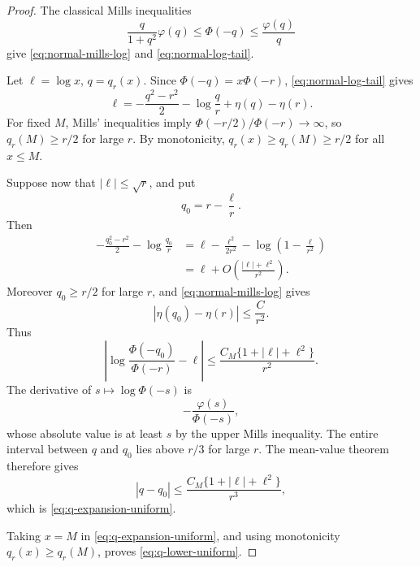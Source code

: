 \begin{proof}
The classical Mills inequalities
\[
 \frac{q}{1+q^2}\varphi(q)
 \le \Phi(-q)
 \le \frac{\varphi(q)}q
\]
give \eqref{eq:normal-mills-log} and
\eqref{eq:normal-log-tail}.

Let \(\ell=\log x\), \(q=q_r(x)\). Since
\(\Phi(-q)=x\Phi(-r)\), \eqref{eq:normal-log-tail} gives
\begin{equation}
 \ell
 =
 -\frac{q^2-r^2}{2}
 -\log\frac qr
 +\eta(q)-\eta(r).
 \label{eq:q-implicit}
\end{equation}
For fixed \(M\), Mills' inequalities imply
\(\Phi(-r/2)/\Phi(-r)\to\infty\), so \(q_r(M)\ge r/2\) for
large \(r\). By monotonicity, \(q_r(x)\ge q_r(M)\ge r/2\) for
all \(x\le M\).

Suppose now that \(|\ell|\le\sqrt r\), and put
\[
 q_0=r-\frac{\ell}{r}.
\]
Then
\begin{align}
 -\frac{q_0^2-r^2}{2}-\log\frac{q_0}{r}
 &=
 \ell-\frac{\ell^2}{2r^2}
 -\log\left(1-\frac{\ell}{r^2}\right)
 \nonumber\\
 &=
 \ell
 +O\left(\frac{|\ell|+\ell^2}{r^2}\right).
 \label{eq:q0-residual}
\end{align}
Moreover \(q_0\ge r/2\) for large \(r\), and
\eqref{eq:normal-mills-log} gives
\[
 |\eta(q_0)-\eta(r)|\le \frac{C}{r^2}.
\]
Thus
\[
 \left|
 \log\frac{\Phi(-q_0)}{\Phi(-r)}-\ell
 \right|
 \le
 \frac{C_M\{1+|\ell|+\ell^2\}}{r^2}.
\]
The derivative of \(s\mapsto\log\Phi(-s)\) is
\[
 -\frac{\varphi(s)}{\Phi(-s)},
\]
whose absolute value is at least \(s\) by the upper Mills
inequality. The entire interval between \(q\) and \(q_0\) lies
above \(r/3\) for large \(r\). The mean-value theorem therefore
gives
\[
 |q-q_0|
 \le
 \frac{C_M\{1+|\ell|+\ell^2\}}{r^3},
\]
which is \eqref{eq:q-expansion-uniform}.

Taking \(x=M\) in \eqref{eq:q-expansion-uniform}, and using
monotonicity \(q_r(x)\ge q_r(M)\), proves
\eqref{eq:q-lower-uniform}.
\end{proof}


